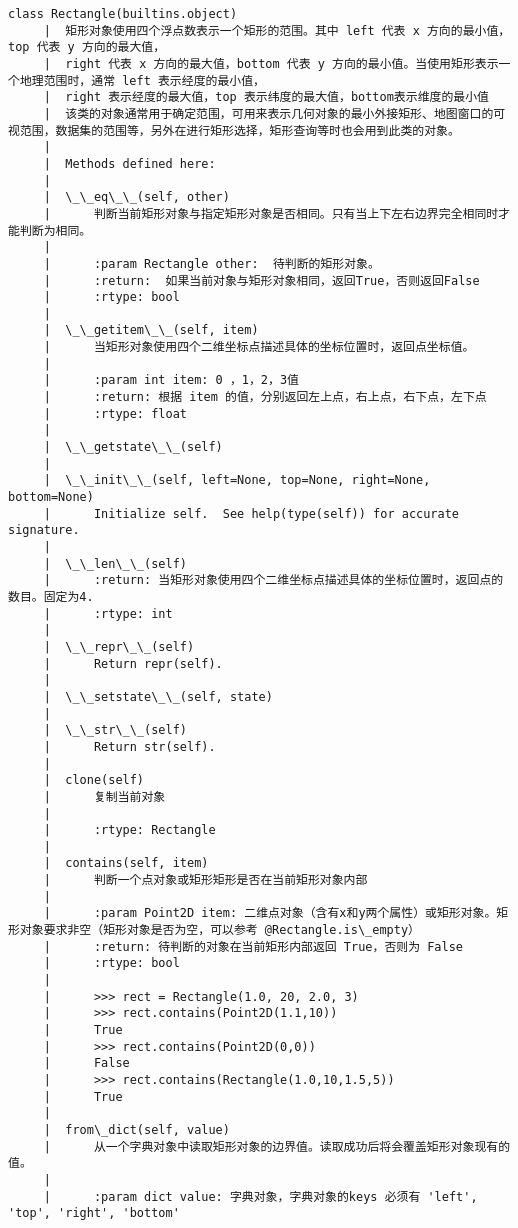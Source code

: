 \documentclass[11pt]{article}
\begin{document}
\begin{Verbatim}[commandchars=\\\{\}]
    class Rectangle(builtins.object)
     |  矩形对象使用四个浮点数表示一个矩形的范围。其中 left 代表 x 方向的最小值，top 代表 y 方向的最大值，
     |  right 代表 x 方向的最大值，bottom 代表 y 方向的最小值。当使用矩形表示一个地理范围时，通常 left 表示经度的最小值，
     |  right 表示经度的最大值，top 表示纬度的最大值，bottom表示维度的最小值
     |  该类的对象通常用于确定范围，可用来表示几何对象的最小外接矩形、地图窗口的可视范围，数据集的范围等，另外在进行矩形选择，矩形查询等时也会用到此类的对象。
     |  
     |  Methods defined here:
     |  
     |  \_\_eq\_\_(self, other)
     |      判断当前矩形对象与指定矩形对象是否相同。只有当上下左右边界完全相同时才能判断为相同。
     |      
     |      :param Rectangle other:  待判断的矩形对象。
     |      :return:  如果当前对象与矩形对象相同，返回True，否则返回False
     |      :rtype: bool
     |  
     |  \_\_getitem\_\_(self, item)
     |      当矩形对象使用四个二维坐标点描述具体的坐标位置时，返回点坐标值。
     |      
     |      :param int item: 0 ，1，2，3值
     |      :return: 根据 item 的值，分别返回左上点，右上点，右下点，左下点
     |      :rtype: float
     |  
     |  \_\_getstate\_\_(self)
     |  
     |  \_\_init\_\_(self, left=None, top=None, right=None, bottom=None)
     |      Initialize self.  See help(type(self)) for accurate signature.
     |  
     |  \_\_len\_\_(self)
     |      :return: 当矩形对象使用四个二维坐标点描述具体的坐标位置时，返回点的数目。固定为4.
     |      :rtype: int
     |  
     |  \_\_repr\_\_(self)
     |      Return repr(self).
     |  
     |  \_\_setstate\_\_(self, state)
     |  
     |  \_\_str\_\_(self)
     |      Return str(self).
     |  
     |  clone(self)
     |      复制当前对象
     |      
     |      :rtype: Rectangle
     |  
     |  contains(self, item)
     |      判断一个点对象或矩形矩形是否在当前矩形对象内部
     |      
     |      :param Point2D item: 二维点对象（含有x和y两个属性）或矩形对象。矩形对象要求非空（矩形对象是否为空，可以参考 @Rectangle.is\_empty）
     |      :return: 待判断的对象在当前矩形内部返回 True，否则为 False
     |      :rtype: bool
     |      
     |      >>> rect = Rectangle(1.0, 20, 2.0, 3)
     |      >>> rect.contains(Point2D(1.1,10))
     |      True
     |      >>> rect.contains(Point2D(0,0))
     |      False
     |      >>> rect.contains(Rectangle(1.0,10,1.5,5))
     |      True
     |  
     |  from\_dict(self, value)
     |      从一个字典对象中读取矩形对象的边界值。读取成功后将会覆盖矩形对象现有的值。
     |      
     |      :param dict value: 字典对象，字典对象的keys 必须有 'left', 'top', 'right', 'bottom'

\end{Verbatim}
\end{document}
